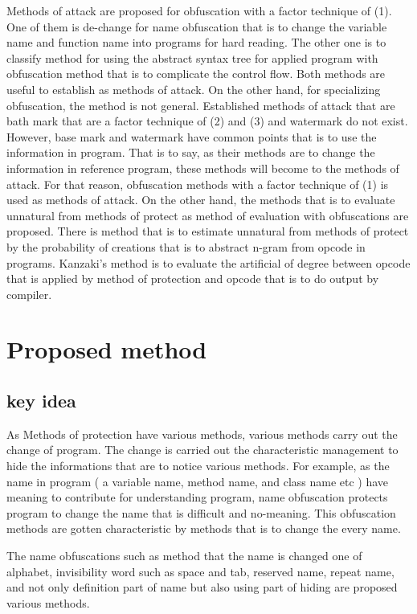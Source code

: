 \documentclass[conference]{IEEEtran}
\begin{document}
Methods of attack are proposed for obfuscation with a factor technique of (1).
One of them is de-change for name obfuscation that is to change the variable name and function name into programs for hard reading\cite{cimato05jss}.
The other one is to classify method for using the abstract syntax tree for applied program with obfuscation method that is to complicate the control flow.
Both methods are useful to establish as methods of attack.
On the other hand, for specializing obfuscation, the method is not general.
Established methods of attack that are bath mark that are a factor technique of (2) and (3) and watermark do not exist.
However, base mark and watermark have common points that is to use the information in program.
That is to say, as their methods are to change the information in reference program, these methods will become to the methods of attack.
For that reason, obfuscation methods with a factor technique of (1) is used as methods of attack\cite{tian13hpcc}.
On the other hand, the methods that is to evaluate unnatural from methods of protect as method of evaluation with obfuscations are proposed\cite{kanzaki14ipsj}.
There is method that is to estimate unnatural from methods of protect by the probability of creations that is to abstract n-gram from opcode in programs.
Kanzaki's method is to evaluate the artificial of degree between opcode that is applied by method of protection and opcode that is to do output by compiler.

\section{Proposed method}

\subsection{key idea}
As Methods of protection have various methods, various methods carry out the change of program.
The change is carried out the characteristic management to hide the informations that are to notice various methods.
For example, as the name in program ( a variable name, method name, and class name etc ) have meaning to contribute for understanding program,
name obfuscation\cite{tyma00patent} protects program to change the name that is difficult and no-meaning.
This obfuscation methods are gotten characteristic by methods that is to change the every name.

The name obfuscations such as method that the name is changed one of alphabet, invisibility word such as space and tab, reserved name, repeat name\cite{dasho}, and not only definition part of name but also using part of hiding are proposed various methods\cite{tamada07ieice}. 
\end{document}
